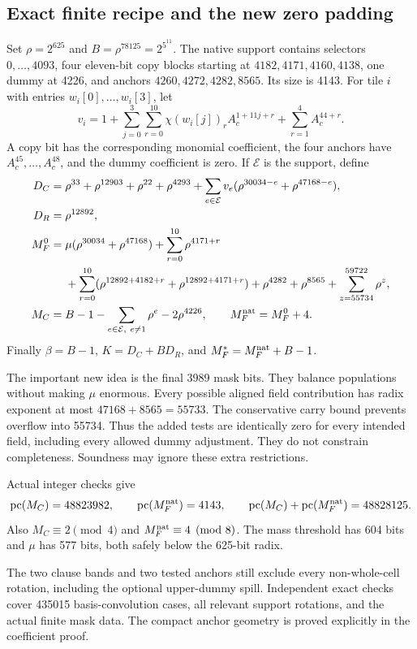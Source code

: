 \documentclass[11 pt]{article}
\begin{document}
\subsection{Exact finite recipe and the new zero padding}
Set $\rho=2^{625}$ and $ B=\rho^{78125}=2^{5^{11}}$. The native support contains selectors $ 0,\ldots, 4093 $, four eleven-bit copy blocks starting at
$ 4182,4171,4160,4138 $, one dummy at 4226, and anchors
$ 4260,4272,4282,8565 $. Its size is 4143.
For tile $ i $ with entries $ w_i[0],\ldots,w_i[3]$, let
\[
v_i=1+\sum_{j=0}^3\sum_{r=0}^{10}\chi(w_i[j])_r A_c^{1+11 j+r}
+\sum_{r=1}^4 A_c^{44+r}.
\]
A copy bit has the corresponding monomial coefficient, the four anchors have $ A_c^{45},\ldots,A_c^{48}$, and the dummy coefficient is zero. If $\mathcal E $ is the support, define
\begin{align*}
D_C={}&\rho^{33}+\rho^{12903}+\rho^{22}+\rho^{4293}
 +\sum_{e\in\mathcal E}v_e(\rho^{30034-e}+\rho^{47168-e}),\\
D_R={}&\rho^{12892},\\
M_F^0={}&\mu(\rho^{30034}+\rho^{47168})+\sum_{r=0}^{10}\rho^{4171+r}\\
&+\sum_{r=0}^{10}(\rho^{12892+4182+r}+\rho^{12892+4171+r})
 +\rho^{4282}+\rho^{8565}+\sum_{z=55734}^{59722}\rho^z,\\
M_C={}&B-1-\sum_{e\in\mathcal E,\ e\ne 1}\rho^e-2\rho^{4226},
\qquad M_F^{\rm nat}=M_F^0+4.
\end{align*}
Finally $\beta=B-1 $, $ K=D_C+BD_R $, and $ M_F^*=M_F^{\rm nat}+B-1 $.

The important new idea is the final 3989 mask bits. They balance populations without making $\mu $ enormous. Every possible aligned field contribution has radix exponent at most $ 47168+8565=55733 $. The conservative carry bound prevents overflow into 55734. Thus the added tests are identically zero for every intended field, including every allowed dummy adjustment. They do not constrain completeness. Soundness may ignore these extra restrictions.

Actual integer checks give
\[
\operatorname{pc}(M_C)=48823982,\qquad
\operatorname{pc}(M_F^{\rm nat})=4143,
\qquad \operatorname{pc}(M_C)+\operatorname{pc}(M_F^{\rm nat})=48828125.
\]
Also $ M_C\equiv 2\pmod 4 $ and $ M_F^{\rm nat}\equiv 4\pmod 8 $. The mass threshold has 604 bits and $\mu $ has 577 bits, both safely below the 625-bit radix.

The two clause bands and two tested anchors still exclude every non-whole-cell rotation, including the optional upper-dummy spill. Independent exact checks cover 435015 basis-convolution cases, all relevant support rotations, and the actual finite mask data. The compact anchor geometry is proved explicitly in the coefficient proof.
\end{document}
